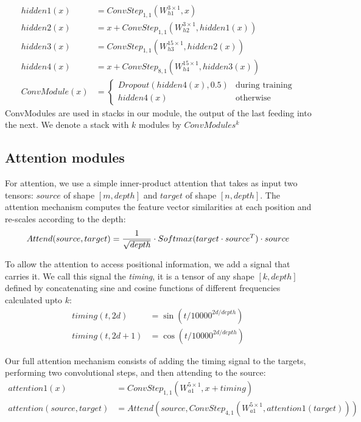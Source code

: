 \documentclass{article}
\newcommand\cs[3]{ConvStep_{#1,#2}(#3)}
\begin{document}
\begin{align*}
    hidden1(x) &= \cs{1}{1}{W^{3 \times 1}_{h1}, x}\\
    hidden2(x) &= x + \cs{1}{1}{W^{3 \times 1}_{h2}, hidden1(x)}\\
    hidden3(x) &= \cs{1}{1}{W^{15 \times 1}_{h3}, hidden2(x)}\\
    hidden4(x) &= x + \cs{8}{1}{W^{15 \times 1}_{h4}, hidden3(x)}\\
    ConvModule(x) &= \begin{cases}
                Dropout(hidden4(x), 0.5) & \text{during training}\\
                hidden4(x) & \text{otherwise}
              \end{cases}
\end{align*}
%
ConvModules are used in stacks in our module, the output of the last feeding into the next.
We denote a stack with \(k\) modules by \(ConvModules^k\)

\subsection{Attention modules}\label{attnmodule}

For attention, we use a simple inner-product attention that takes as input two tensors: \(source\) of shape \([m, depth]\) and \(target\) of shape \([n, depth]\). The attention mechanism computes the feature vector similarities at each position and re-scales according to the depth:
\[
    Attend(source, target) = \frac{1}{\sqrt{depth}} \cdot Softmax(target \cdot source^{T}) \cdot source\\
\]

To allow the attention to access positional information, we add a signal that carries it.
We call this signal the \emph{timing}, it is a tensor of any shape \([k, depth]\) defined
by concatenating sine and cosine functions of different frequencies calculated upto $k$:
\begin{align*}
    timing{(t, 2d)}   &= \sin(t / 10000^{2d/depth}) \\
    timing{(t, 2d+1)} &= \cos(t / 10000^{2d/depth})
\end{align*}

Our full attention mechanism consists of adding the timing signal to the targets,
performing two convolutional steps, and then attending to the source:
\begin{align*}
    attention1(x) &= \cs{1}{1}{W^{5 \times 1}_{a1}, x + timing}\\
    attention(source, target) &= Attend(source, \cs{4}{1}{W^{5 \times 1}_{a1}, attention1(target)})
\end{align*}
\end{document}
